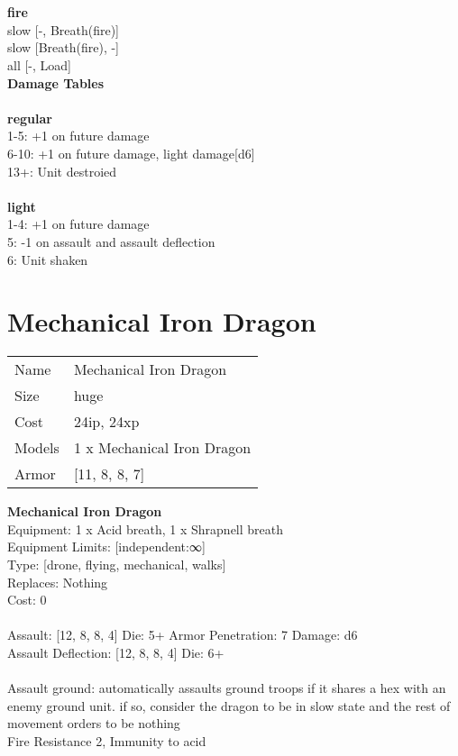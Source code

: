  
\ \\



\ \\ {\bf fire } \\
slow [-, Breath(fire)] \\
slow [Breath(fire), -] \\
all [-, Load] \\


{\bf Damage Tables} \\
\ \\ {\bf regular } \\
1-5: +1 on future damage \\
6-10: +1 on future damage, light damage[d6] \\
13+: Unit destroied \\
\ \\ {\bf light } \\
1-4: +1 on future damage \\
5: -1 on assault and assault deflection \\
6: Unit shaken \\










\pagebreak\pagebreak

\section{ Mechanical Iron Dragon }

\begin{tabular}{ll}
  Name & Mechanical Iron Dragon \\
  Size & huge\\
  Cost & 24ip, 24xp\\
  Models & 1 x Mechanical Iron Dragon\\
  Armor & [11, 8, 8, 7]\\
\end{tabular}

\noindent 

{\bf Mechanical Iron Dragon } \\
Equipment: 1 x Acid breath, 1 x Shrapnell breath \\
Equipment Limits: [independent:∞] \\
Type: [drone, flying, mechanical, walks] \\
Replaces: Nothing \\
Cost: 0\\
\ \\
Assault: [12, 8, 8, 4] Die: 5+ Armor Penetration: 7 Damage: d6 \\
Assault Deflection: [12, 8, 8, 4] Die: 6+\\
\indent  
\ \\
Assault ground: automatically assaults ground troops if it shares a hex with an enemy ground unit. if so, consider the dragon to be in slow state and the rest of movement orders to be nothing\\ 
Fire Resistance 2, Immunity to acid\\ 

